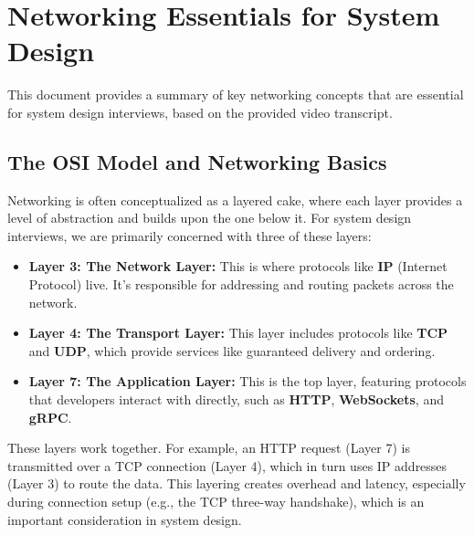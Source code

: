 \documentclass{article}
\begin{document}
\newpage
\section{Networking Essentials for System Design}
This document provides a summary of key networking concepts that are essential for system design interviews, based on the provided video transcript.

\subsection{The OSI Model and Networking Basics}
Networking is often conceptualized as a layered cake, where each layer provides a level of abstraction and builds upon the one below it. For system design interviews, we are primarily concerned with three of these layers:
\begin{itemize}
    \item \textbf{Layer 3: The Network Layer:} This is where protocols like \textbf{IP} (Internet Protocol) live. It's responsible for addressing and routing packets across the network.
    \item \textbf{Layer 4: The Transport Layer:} This layer includes protocols like \textbf{TCP} and \textbf{UDP}, which provide services like guaranteed delivery and ordering.
    \item \textbf{Layer 7: The Application Layer:} This is the top layer, featuring protocols that developers interact with directly, such as \textbf{HTTP}, \textbf{WebSockets}, and \textbf{gRPC}.
\end{itemize}
These layers work together. For example, an HTTP request (Layer 7) is transmitted over a TCP connection (Layer 4), which in turn uses IP addresses (Layer 3) to route the data. This layering creates overhead and latency, especially during connection setup (e.g., the TCP three-way handshake), which is an important consideration in system design.
\end{document}

